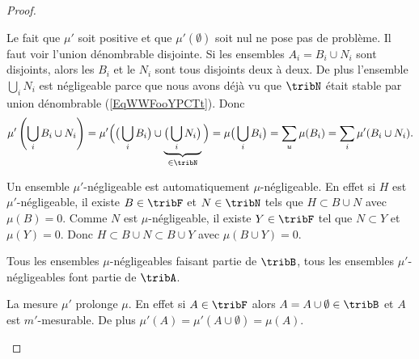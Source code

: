 \begin{proof}
\begin{subproof}

		Le fait que \( \mu'\) soit positive et que \( \mu'(\emptyset)\) soit nul ne pose pas de problème. Il faut voir l'union dénombrable disjointe. Si les ensembles \( A_i=B_i\cup N_i\) sont disjoints, alors les \( B_i\) et le \( N_i\) sont tous disjoints deux à deux. De plus l'ensemble \( \bigcup_iN_i\) est négligeable parce que nous avons déjà vu que \( \tribN\) était stable par union dénombrable (\ref{EqWWFooYPCTt}). Donc
		\begin{equation}
			\mu'\left( \bigcup_i B_i\cup N_i \right)=\mu'\Big( \big( \bigcup_iB_i \big)\cup\underbrace{\big( \bigcup_iN_i \big)}_{\in\tribN} \Big)=\mu\big( \bigcup_iB_i \big)=\sum_u\mu(B_i)=\sum_i\mu'(B_i\cup N_i).
		\end{equation}

		Un ensemble \( \mu'\)-négligeable est automatiquement \( \mu\)-négligeable. En effet si \( H\) est \( \mu'\)-négligeable, il existe \( B\in\tribF\) et \( N\in\tribN\) tels que \( H\subset B\cup N\) avec \( \mu(B)=0\). Comme \( N\) est \( \mu\)-négligeable, il existe \( Y\in\tribF\) tel que \( N\subset Y\) et \( \mu(Y)=0\). Donc \( H\subset B\cup N\subset B\cup Y\) avec \( \mu(B\cup Y)=0\).

		Tous les ensembles \( \mu\)-négligeables faisant partie de \( \tribB\), tous les ensembles \( \mu'\)-négligeables font partie de \( \tribA\).

		\spitem[Prolongement]
		La mesure \( \mu'\) prolonge \( \mu\). En effet si \( A\in\tribF\) alors \( A=A\cup\emptyset\in\tribB\) et \( A\) est \( m'\)-mesurable. De plus \( \mu'(A)=\mu'(A\cup\emptyset)=\mu(A)\).
		\spitem[Minimalité]


\end{subproof}
\end{proof}
